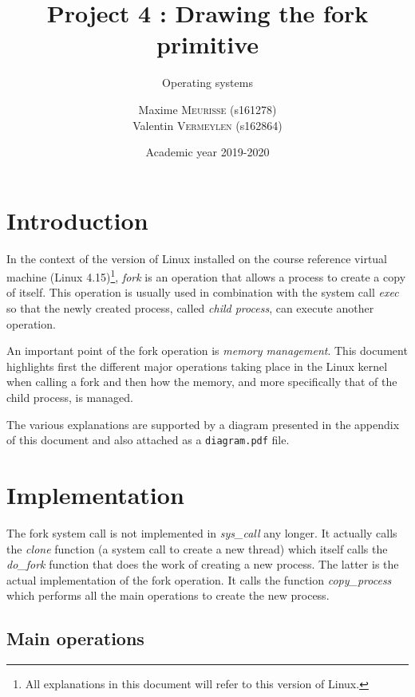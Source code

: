 \documentclass[a4paper, 12pt]{article}
\institute{University of Liège}
\title{Project 4 : Drawing the fork primitive}
\subtitle{Operating systems}
\author{
    Maxime \textsc{Meurisse} (s161278)\\
    Valentin \textsc{Vermeylen} (s162864)\\
}
\date{Academic year 2019-2020}
\begin{document}
    
    \maketitle
    
    
    \section{Introduction}
    
    In the context of the version of Linux installed on the course reference virtual machine (Linux 4.15)\footnote{All explanations in this document will refer to this version of Linux.}, \emph{fork} is an operation that allows a process to create a copy of itself. This operation is usually used in combination with the system call \emph{exec} so that the newly created process, called \emph{child process}, can execute another operation.
    
    An important point of the fork operation is \emph{memory management}. This document highlights first the different major operations taking place in the Linux kernel when calling a fork and then how the memory, and more specifically that of the child process, is managed.
    
    The various explanations are supported by a diagram presented in the appendix of this document and also attached as a \texttt{diagram.pdf} file.
    
    
    \section{Implementation}
    
    The fork system call is not implemented in \emph{sys\_call} any longer. It actually calls the \emph{clone} function (a system call to create a new thread) which itself calls the \emph{do\_fork} function that does the work of creating a new process. The latter is the actual implementation of the fork operation. It calls the function \emph{copy\_process} which performs all the main operations to create the new process.
    
    \subsection{Main operations}
    
\end{document}
